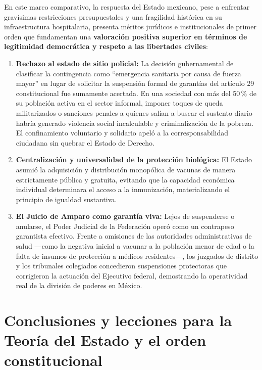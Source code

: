 \documentclass[12pt,spanish,letterpaper,oneside]{article}
\begin{document}
En este marco comparativo, la respuesta del Estado mexicano, pese a enfrentar grav\'isimas restricciones presupuestales y una fragilidad hist\'orica en su infraestructura hospitalaria, presenta m\'eritos jur\'idicos e institucionales de primer orden que fundamentan una \textbf{valoraci\'on positiva superior en t\'erminos de legitimidad democr\'atica y respeto a las libertades civiles}:
\begin{enumerate}
  \item \textbf{Rechazo al estado de sitio policial:} La decisi\'on gubernamental de clasificar la contingencia como ``emergencia sanitaria por causa de fuerza mayor'' \citep{csgAcuerdoEmergencia2020} en lugar de solicitar la suspensi\'on formal de garant\'ias del art\'iculo 29 constitucional fue sumamente acertada. En una sociedad con m\'as del 50\,\% de su poblaci\'on activa en el sector informal, imponer toques de queda militarizados o sanciones penales a quienes sal\'ian a buscar el sustento diario habr\'ia generado violencia social incalculable y criminalizaci\'on de la pobreza. El confinamiento voluntario y solidario apel\'o a la corresponsabilidad ciudadana sin quebrar el Estado de Derecho.
  \item \textbf{Centralizaci\'on y universalidad de la protecci\'on biol\'ogica:} El Estado asumi\'o la adquisici\'on y distribuci\'on monop\'olica de vacunas de manera estrictamente p\'ublica y gratuita, evitando que la capacidad econ\'omica individual determinara el acceso a la inmunizaci\'on, materializando el principio de igualdad sustantiva.
  \item \textbf{El Juicio de Amparo como garant\'ia viva:} Lejos de suspenderse o anularse, el Poder Judicial de la Federaci\'on oper\'o como un contrapeso garantista efectivo. Frente a omisiones de las autoridades administrativas de salud ---como la negativa inicial a vacunar a la poblaci\'on menor de edad o la falta de insumos de protecci\'on a m\'edicos residentes---, los juzgados de distrito y los tribunales colegiados concedieron suspensiones protectoras que corrigieron la actuaci\'on del Ejecutivo federal, demostrando la operatividad real de la divisi\'on de poderes en M\'exico.
\end{enumerate}

\clearpage
\section[Conclusiones]{Conclusiones y lecciones para la Teor\'ia del Estado y el orden constitucional}
\end{document}
